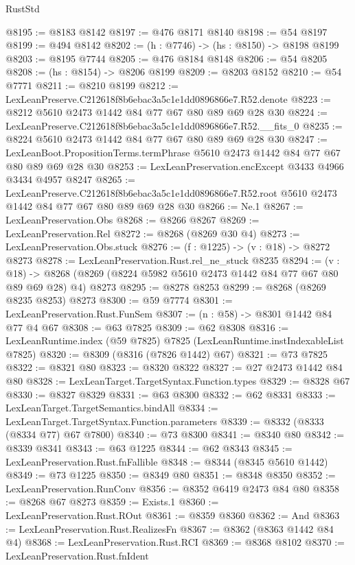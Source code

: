 \begin{lexlean}{RustStd}
\begin{coremodule}
@8195 := @8183 @8142
@8197 := @476 @8171 @8140
@8198 := @54 @8197
@8199 := @494 @8142
@8202 := (h : @7746) -> (hs : @8150) -> @8198 @8199
@8203 := @8195 @7744
@8205 := @476 @8184 @8148
@8206 := @54 @8205
@8208 := (hs : @8154) -> @8206 @8199
@8209 := @8203 @8152
@8210 := @54 @7771
@8211 := @8210 @8199
@8212 := LexLeanPreserve.C212618f8b6ebac3a5c1e1dd0896866e7.R52.denote
@8223 := @8212 @5610 @2473 @1442 @84 @77 @67 @80 @89 @69 @28 @30
@8224 := LexLeanPreserve.C212618f8b6ebac3a5c1e1dd0896866e7.R52.__fits_0
@8235 := @8224 @5610 @2473 @1442 @84 @77 @67 @80 @89 @69 @28 @30
@8247 := LexLeanBoot.PropositionTerms.termPhrase @5610 @2473 @1442 @84 @77 @67 @80 @89 @69 @28 @30
@8253 := LexLeanPreservation.encExcept @3433 @4966 @3434 @4957 @8247
@8265 := LexLeanPreserve.C212618f8b6ebac3a5c1e1dd0896866e7.R52.root
    @5610
    @2473
    @1442
    @84
    @77
    @67
    @80
    @89
    @69
    @28
    @30
@8266 := Ne.{1}
@8267 := LexLeanPreservation.Obs
@8268 := @8266 @8267
@8269 := LexLeanPreservation.Rel
@8272 := @8268 (@8269 @30 @4)
@8273 := LexLeanPreservation.Obs.stuck
@8276 := (f : @1225) -> (v : @18) -> @8272 @8273
@8278 := LexLeanPreservation.Rust.rel_ne_stuck @8235
@8294 := (v : @18) ->
  @8268 (@8269 (@8224 @5982 @5610 @2473 @1442 @84 @77 @67 @80 @89 @69 @28) @4) @8273
@8295 := @8278 @8253
@8299 := @8268 (@8269 @8235 @8253) @8273
@8300 := @59 @7774
@8301 := LexLeanPreservation.Rust.FunSem
@8307 := (n : @58) -> @8301 @1442 @84 @77 @4 @67
@8308 := @63 @7825
@8309 := @62 @8308
@8316 := LexLeanRuntime.index (@59 @7825) @7825 (LexLeanRuntime.instIndexableList @7825)
@8320 := @8309 (@8316 (@7826 @1442) @67)
@8321 := @73 @7825
@8322 := @8321 @80
@8323 := @8320 @8322
@8327 := @27 @2473 @1442 @84 @80
@8328 := LexLeanTarget.TargetSyntax.Function.types
@8329 := @8328 @67
@8330 := @8327 @8329
@8331 := @63 @8300
@8332 := @62 @8331
@8333 := LexLeanTarget.TargetSemantics.bindAll
@8334 := LexLeanTarget.TargetSyntax.Function.parameters
@8339 := @8332 (@8333 (@8334 @77) @67 @7800)
@8340 := @73 @8300
@8341 := @8340 @80
@8342 := @8339 @8341
@8343 := @63 @1225
@8344 := @62 @8343
@8345 := LexLeanPreservation.Rust.fnFallible
@8348 := @8344 (@8345 @5610 @1442)
@8349 := @73 @1225
@8350 := @8349 @80
@8351 := @8348 @8350
@8352 := LexLeanPreservation.RunConv
@8356 := @8352 @6419 @2473 @84 @80
@8358 := @8268 @67 @8273
@8359 := Exists.{1}
@8360 := LexLeanPreservation.Rust.ROut
@8361 := @8359 @8360
@8362 := And
@8363 := LexLeanPreservation.Rust.RealizesFn
@8367 := @8362 (@8363 @1442 @84 @4)
@8368 := LexLeanPreservation.Rust.RCI
@8369 := @8368 @8102
@8370 := LexLeanPreservation.Rust.fnIdent

\end{coremodule}
\end{lexlean}
